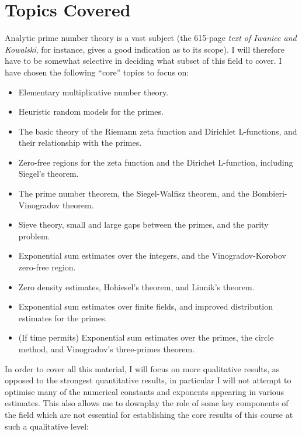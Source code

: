 \documentclass[10pt,reqno]{amsart}
\begin{document}
\section{Topics Covered}

Analytic prime number theory is a vast subject (the 615-page \emph{text of Iwaniec and Kowalski}, for instance, gives a good indication as to its scope). I will therefore have to be somewhat selective in deciding what subset of this field to cover. I have chosen the following “core” topics to focus on:
%
\begin{itemize}
    \item Elementary multiplicative number theory.
    \item Heuristic random models for the primes.
    \item The basic theory of the Riemann zeta function and Dirichlet L-functions, and their relationship with the primes.
    \item Zero-free regions for the zeta function and the Dirichet L-function, including Siegel’s theorem.
    \item The prime number theorem, the Siegel-Walfisz theorem, and the Bombieri-Vinogradov theorem.
    \item Sieve theory, small and large gaps between the primes, and the parity problem.
    \item Exponential sum estimates over the integers, and the Vinogradov-Korobov zero-free region.
    \item Zero density estimates, Hohiesel’s theorem, and Linnik’s theorem.
    \item Exponential sum estimates over finite fields, and improved distribution estimates for the primes.
    \item (If time permits) Exponential sum estimates over the primes, the circle method, and Vinogradov’s three-primes theorem.
\end{itemize}
%
In order to cover all this material, I will focus on more qualitative results, as opposed to the strongest quantitative results, in particular I will not attempt to optimise many of the numerical constants and exponents appearing in various estimates. This also allows me to downplay the role of some key components of the field which are not essential for establishing the core results of this course at such a qualitative level:
%
\end{document}
